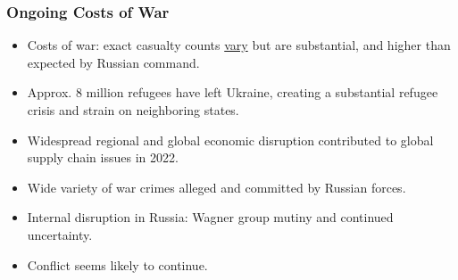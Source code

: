 \documentclass[handout]{beamer}
\begin{document}
\begin{frame} 
	\frametitle{\LARGE{Ongoing Costs of War}}
	\begin{itemize}
		\item Costs of war: exact casualty counts \href{https://en.wikipedia.org/wiki/Russian_invasion_of_Ukraine\#Casualties}{vary} but are substantial, and higher than expected by Russian command. \pause
		\item Approx. 8 million refugees have left Ukraine, creating a substantial refugee crisis and strain on neighboring states. \pause
		\item Widespread regional and global economic disruption contributed to global supply chain issues in 2022. \pause
		\item Wide variety of war crimes alleged and committed by Russian forces. \pause
		\item Internal disruption in Russia: Wagner group mutiny and continued uncertainty. \pause
		\item Conflict seems likely to continue.
	\end{itemize}
\end{frame}
\end{document}
